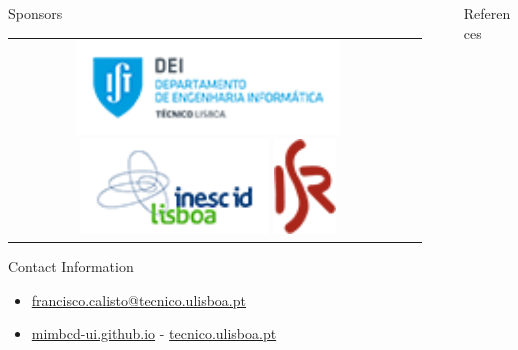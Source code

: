 \documentclass[final]{beamer}
\newlength{\sepwid}
\newlength{\onecolwid}
\begin{document}
\begin{frame}[t]
\begin{columns}[t]
\begin{column}{\onecolwid}
\begin{block}{\large Sponsors}
\begin{tabular}{SL}
\hspace*{0.50cm}
\includegraphics[height=2.5cm]{DEI_RGB.png}
\hspace*{0.50cm}
\includegraphics[height=2.5cm]{logo-inesc-id.png}
\hspace*{0.50cm}
\includegraphics[height=2.5cm]{logo_200.png}
&
\end{tabular}

\begin{alertblock}{\small Contact Information}
\vspace*{-0.75cm}
\begin{footnotesize}
\begin{itemize}
\item \href{mailto:francisco.calisto@tecnico.ulisboa.pt}{francisco.calisto@tecnico.ulisboa.pt}
\item \href{https://mimbcd-ui.github.io/}{mimbcd-ui.github.io} - \href{https://tecnico.ulisboa.pt/}{tecnico.ulisboa.pt}
\end{itemize}
\end{footnotesize}
\end{alertblock}

\end{block}	
\vspace*{-1.25cm}

\end{column} %
\begin{column}{\sepwid}\end{column} %
\begin{column}{\onecolwid} %

\begin{block}{\large References}
\vspace*{-0.5cm}
\nocite{*} %
{\footnotesize
%
}
\end{block} 
\end{column} %


\end{columns}
\end{frame}
\end{document}
